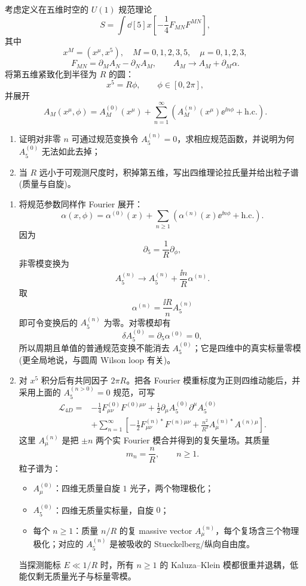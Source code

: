 \begin{question}[15 分]
考虑定义在五维时空的 $U(1)$ 规范理论
\[
S=\int\dd[5]{x}\left[-\frac14F_{MN}F^{MN}\right],
\]
其中
\[
x^M=(x^\mu,x^5),\quad M=0,1,2,3,5,\quad \mu=0,1,2,3,
\]
\[
F_{MN}=\partial_MA_N-\partial_NA_M,
\qquad
A_M\to A_M+\partial_M\alpha.
\]
将第五维紧致化到半径为 $R$ 的圆：
\[
x^5=R\phi,\qquad \phi\in[0,2\pi],
\]
并展开
\[
A_M(x^\mu,\phi)=A_M^{(0)}(x^\mu)
+\sum_{n=1}^\infty\left(A_M^{(n)}(x^\mu)\ee^{\ii n\phi}+\mathrm{h.c.}\right).
\]
\begin{enumerate}
  \item 证明对非零 $n$ 可通过规范变换令 $A_5^{(n)}=0$，求相应规范函数，并说明为何 $A_5^{(0)}$ 无法如此去掉；
  \item 当 $R$ 远小于可观测尺度时，积掉第五维，写出四维理论拉氏量并给出粒子谱(质量与自旋)。
\end{enumerate}
\begin{solution}
\begin{enumerate}
  \item 将规范参数同样作 Fourier 展开：
  \[
  \alpha(x,\phi)=\alpha^{(0)}(x)+\sum_{n\ge1}
  \left(\alpha^{(n)}(x)\ee^{\ii n\phi}+\mathrm{h.c.}\right).
  \]
  因为
  \[
  \partial_5=\frac1R\partial_\phi,
  \]
  非零模变换为
  \[
  A_5^{(n)}\to A_5^{(n)}+\frac{\ii n}{R}\alpha^{(n)}.
  \]
  取
  \[
  \boxed{\alpha^{(n)}=\frac{\ii R}{n}A_5^{(n)}}
  \]
  即可令变换后的 $A_5^{(n)}$ 为零。对零模却有
  \[
  \delta A_5^{(0)}=\partial_5\alpha^{(0)}=0,
  \]
  所以周期且单值的普通规范变换不能消去 $A_5^{(0)}$；它是四维中的真实标量零模(更全局地说，与圆周 Wilson loop 有关)。

  \item 对 $x^5$ 积分后有共同因子 $2\pi R$。把各 Fourier 模重标度为正则四维动能后，并采用上面的 $A_5^{(n>0)}=0$ 规范，可写
  \[
  \boxed{
  \begin{aligned}
  \mathcal L_{4D}={}&-\frac14F_{\mu\nu}^{(0)}F^{(0)\mu\nu}
  +\frac12\partial_\mu A_5^{(0)}\partial^\mu A_5^{(0)}\\
  &+\sum_{n=1}^\infty\left[
  -\frac12F_{\mu\nu}^{(n)*}F^{(n)\mu\nu}
  +\frac{n^2}{R^2}A_\mu^{(n)*}A^{(n)\mu}
  \right].
  \end{aligned}}
  \]
  这里 $A_\mu^{(n)}$ 是把 $\pm n$ 两个实 Fourier 模合并得到的复矢量场。其质量
  \[
  \boxed{m_n=\frac{n}{R}},\qquad n\ge1.
  \]
  粒子谱为：
  \begin{itemize}
    \item $A_\mu^{(0)}$：四维无质量自旋 $1$ 光子，两个物理极化；
    \item $A_5^{(0)}$：四维无质量实标量，自旋 $0$；
    \item 每个 $n\ge1$：质量 $n/R$ 的复 massive vector $A_\mu^{(n)}$，每个复场含三个物理极化；对应的 $A_5^{(n)}$ 是被吸收的 Stueckelberg/纵向自由度。
  \end{itemize}
  当探测能标 $E\ll1/R$ 时，所有 $n\ge1$ 的 Kaluza--Klein 模都很重并退耦，低能仅剩无质量光子与标量零模。
\end{enumerate}
\end{solution}
\end{question}

